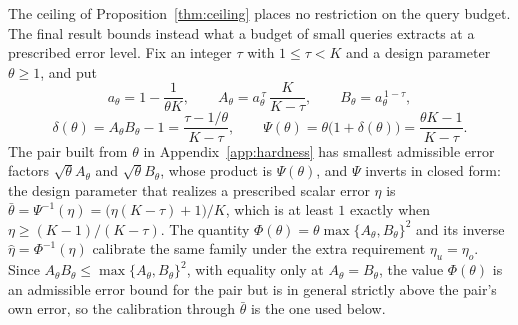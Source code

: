 The ceiling of Proposition~\ref{thm:ceiling} places no restriction on the query
budget.  The final result bounds instead what a budget of small queries
extracts at a prescribed error level.  Fix an integer $\tau$ with
$1\le\tau<K$ and a design parameter $\theta\ge1$, and put
\[
  a_\theta=1-\frac{1}{\theta K},\qquad
  A_\theta=a_\theta^{\,\tau}\,\frac{K}{K-\tau},\qquad
  B_\theta=a_\theta^{\,1-\tau},
\]
\[
  \delta(\theta)=A_\theta B_\theta-1=\frac{\tau-1/\theta}{K-\tau},
  \qquad
  \Psi(\theta)=\theta\bigl(1+\delta(\theta)\bigr)=\frac{\theta K-1}{K-\tau}.
\]
The pair built from $\theta$ in Appendix~\ref{app:hardness} has smallest
admissible error factors $\sqrt\theta A_\theta$ and $\sqrt\theta B_\theta$,
whose product is $\Psi(\theta)$, and $\Psi$ inverts in closed form: the design
parameter that realizes a prescribed scalar error $\eta$ is
$\bar\theta=\Psi^{-1}(\eta)=\bigl(\eta(K-\tau)+1\bigr)/K$, which is at least
$1$ exactly when $\eta\ge(K-1)/(K-\tau)$.
The quantity $\Phi(\theta)=\theta\max\{A_\theta,B_\theta\}^{2}$ and its
inverse $\hat\eta=\Phi^{-1}(\eta)$ calibrate the same family under the extra
requirement $\eta_u=\eta_o$.  Since $A_\theta B_\theta\le
\max\{A_\theta,B_\theta\}^{2}$, with equality only at $A_\theta=B_\theta$,
the value $\Phi(\theta)$ is an admissible error bound for the pair but is in
general strictly above the pair's own error, so the calibration through
$\bar\theta$ is the one used below.

